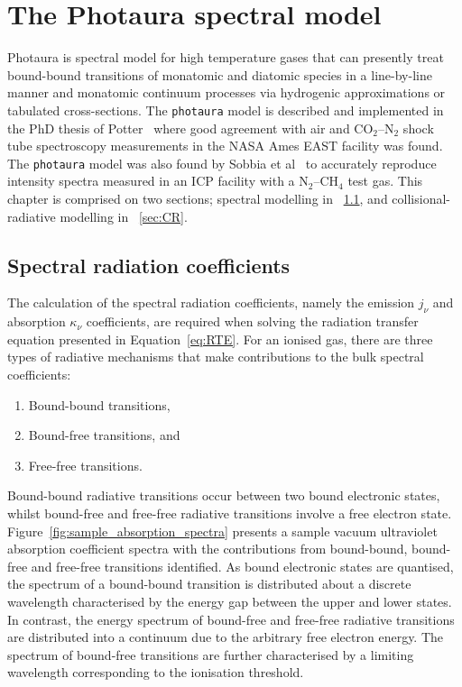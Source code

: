 \chapter{The Photaura spectral model}
\label{ch:photaura}

Photaura is spectral model for high temperature gases that can presently treat bound-bound transitions of monatomic and diatomic species in a line-by-line manner and monatomic continuum processes via hydrogenic approximations or tabulated cross-sections.
The \texttt{photaura} model is described and implemented in the PhD thesis of Potter~\cite{Potter_PhD} where good agreement with air and CO$_2$--N$_2$ shock tube spectroscopy measurements in the NASA Ames EAST facility was found.  
The \texttt{photaura} model was also found by Sobbia et al~\cite{SLB+2013} to accurately reproduce intensity spectra measured in an ICP facility with a N$_2$--CH$_4$ test gas.
This chapter is comprised on two sections; spectral modelling in \textsection~\ref{sec:spec_rad}, and collisional-radiative modelling in \textsection~\ref{sec:CR}.

\section{Spectral radiation coefficients}
\label{sec:spec_rad}

The calculation of the spectral radiation coefficients, namely the emission $j_\nu$ and absorption $\kappa_\nu$ coefficients, are required when solving the radiation transfer equation presented in Equation~\ref{eq:RTE}.
For an ionised gas, there are three types of radiative mechanisms that make contributions to the bulk spectral coefficients:

\begin{enumerate}
 \item Bound-bound transitions,
 \item Bound-free transitions, and
 \item Free-free transitions.
\end{enumerate}

Bound-bound radiative transitions occur between two bound electronic states, whilst bound-free and free-free radiative transitions involve a free electron state.
Figure~\ref{fig:sample_absorption_spectra} presents a sample vacuum ultraviolet absorption coefficient spectra with the contributions from bound-bound, bound-free and free-free transitions identified.
As bound electronic states are quantised, the spectrum of a bound-bound transition is distributed about a discrete wavelength characterised by the energy gap between the upper and lower states.
In contrast, the energy spectrum of bound-free and free-free radiative transitions are distributed into a continuum due to the arbitrary free electron energy.
The spectrum of bound-free transitions are further characterised by a limiting wavelength corresponding to the ionisation threshold.

